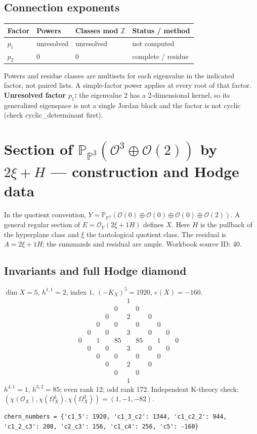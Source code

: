\documentclass[10pt,a4paper]{article}
\begin{document}
\subsection*{Connection exponents}
\begin{center}\begin{tabular}{llll}\toprule Factor & Powers & Classes mod $\mathbb Z$ & Status / method\\\midrule
$p_{1}$ & unresolved & unresolved & not computed\\
$p_{2}$ & $0$ & $0$ & complete / residue\\
\bottomrule\end{tabular}\end{center}
Powers and residue classes are multisets for each eigenvalue in the indicated factor, not paired lists. A simple-factor power applies at every root of that factor.
\textbf{Unresolved factor $p_{1}$:} the eigenvalue 2 has a 2-dimensional kernel, so its generalized eigenspace is not a single Jordan block and the factor is not cyclic (check cyclic\_determinant first).
\clearpage\section*{Section of $\mathbb P_{\mathbb P^{3}}(\mathcal O^{3}\oplus \mathcal O(2))$ by $2\xi +H$ --- construction and Hodge data}\label{entry:PB5-040}
In the quotient convention, $Y=\mathbb P_{\mathbb P^{3}}(\mathcal O(0)\oplus\mathcal O(0)\oplus\mathcal O(0)\oplus\mathcal O(2))$.
A general regular section of $E=\mathcal O_Y(2\xi+1H)$ defines $X$.
Here $H$ is the pullback of the hyperplane class and $\xi$ the tautological quotient class. The residual is $A=2\xi+1H$; the summands and residual are ample.
Workbook source ID: 40.
\subsection*{Invariants and full Hodge diamond}
$\dim X=5$, $h^{1,1}=2$, index $1$, $(-K_X)^5=1920$, $e(X)=-160$.
\[\begin{array}{ccccccccccc}&&&&&1&&&&&\\&&&&0&&0&&&&\\&&&0&&2&&0&&&\\&&0&&0&&0&&0&&\\&0&&0&&3&&0&&0&\\0&&1&&85&&85&&1&&0\\&0&&0&&3&&0&&0&\\&&0&&0&&0&&0&&\\&&&0&&2&&0&&&\\&&&&0&&0&&&&\\&&&&&1&&&&&\end{array}\]
$h^{4,1}=1$, $h^{3,2}=85$; even rank 12; odd rank 172.
Independent K-theory check: $(\chi(\mathcal O_X),\chi(\Omega_X^1),\chi(\Omega_X^2))=(1, -1, -82)$.
\begin{lstlisting}
chern_numbers = {'c1_5': 1920, 'c1_3_c2': 1344, 'c1_c2_2': 944, 'c1_2_c3': 208, 'c2_c3': 156, 'c1_c4': 256, 'c5': -160}
\end{lstlisting}
\end{document}
